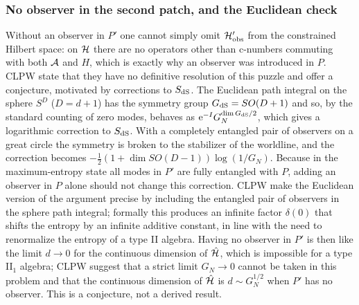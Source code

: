 \subsubsection*{No observer in the second patch, and the Euclidean check}
Without an observer in $P'$ one cannot simply omit $\mathcal{H}'_{\rm obs}$ from the constrained Hilbert space: on $\mathcal{H}$ there are no operators other than c-numbers commuting with both $\mathcal{A}$ and $H$, which is exactly why an observer was introduced in $P$. CLPW state that they have no definitive resolution of this puzzle and offer a conjecture, motivated by corrections to $S_{\rm dS}$. The Euclidean path integral on the sphere $S^D$ ($D=d+1$) has the symmetry group $G_{\rm dS}=SO(D+1)$ and so, by the standard counting of zero modes, behaves as $\mathrm{e}^{-I}G_N^{\dim G_{\rm dS}/2}$, which gives a logarithmic correction to $S_{\rm dS}$. With a completely entangled pair of observers on a great circle the symmetry is broken to the stabilizer of the worldline, and the correction becomes $-\tfrac12(1+\dim SO(D-1))\log(1/G_N)$. Because in the maximum-entropy state all modes in $P'$ are fully entangled with $P$, adding an observer in $P$ alone should not change this correction. CLPW make the Euclidean version of the argument precise by including the entangled pair of observers in the sphere path integral; formally this produces an infinite factor $\delta(0)$ that shifts the entropy by an infinite additive constant, in line with the need to renormalize the entropy of a type II algebra. Having no observer in $P'$ is then like the limit $d\to0$ for the continuous dimension of $\hat{\mathcal{H}}$, which is impossible for a type II$_1$ algebra; CLPW suggest that a strict limit $G_N\to0$ cannot be taken in this problem and that the continuous dimension of $\hat{\mathcal{H}}$ is $d\sim G_N^{1/2}$ when $P'$ has no observer. This is a conjecture, not a derived result.

